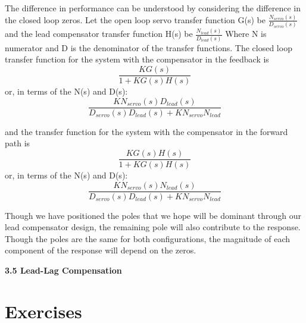 \documentclass[11pt,a4paper]{article}
\begin{document}
The difference in performance can be understood by considering the difference in the closed loop zeros. Let the open loop servo transfer function G(s) be $\frac{N_{servo}(s)}{D_{servo}(s)}$ and the lead compensator transfer function H(s) be $\frac{N_{lead}(s)}{D_{lead}(s)}$ Where N is numerator and D is the denominator of the transfer functions. The closed loop transfer function for the system with the compensator in the feedback is
\begin{equation}
	\frac{KG(s)}{1+KG(s)H(s)}
\end{equation}
or, in terms of the N(s) and D(s):
\begin{equation}
	\frac{K N_{servo}(s) D_{lead}(s)}{D_{servo}(s) D_{lead}(s) + K N_{servo} N_{lead}}
\end{equation}

and the transfer function for the system with the compensator in the forward path is
\begin{equation}
	\frac{KG(s)H(s)}{1+KG(s)H(s)}
\end{equation}
or, in terms of the N(s) and D(s):
\begin{equation}
	\frac{K N_{servo}(s) N_{lead}(s)}{D_{servo}(s) D_{lead}(s) + K N_{servo} N_{lead}}
\end{equation}

Though we have positioned the poles that we hope will be dominant through our lead compensator design, the remaining pole will also contribute to the response. Though the poles are the same for both configurations, the magnitude of each component of the response will depend on the zeros.

\textbf{3.5 Lead-Lag Compensation}


\section{Exercises}
\end{document}
